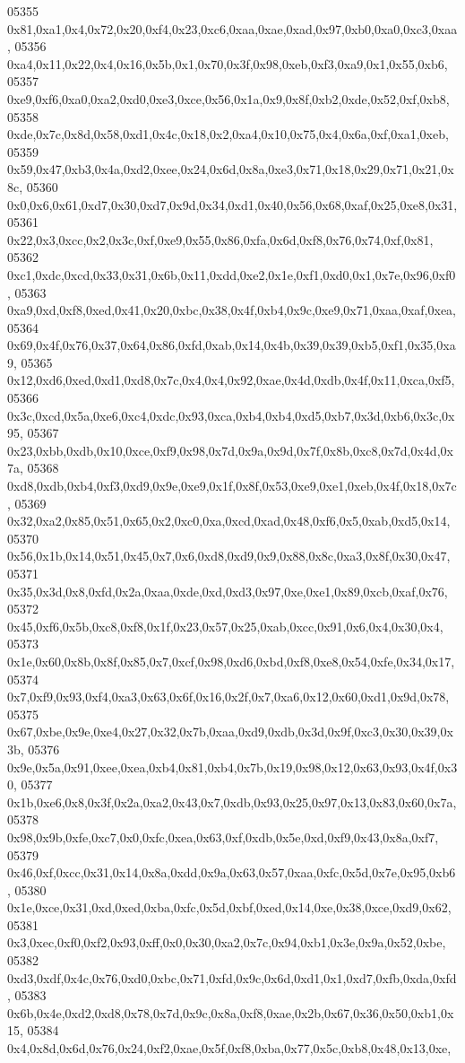 \begin{DoxyCode}
05355   0x81,0xa1,0x4,0x72,0x20,0xf4,0x23,0xc6,0xaa,0xae,0xad,0x97,0xb0,0xa0,0xc3,0xaa,
05356   0xa4,0x11,0x22,0x4,0x16,0x5b,0x1,0x70,0x3f,0x98,0xeb,0xf3,0xa9,0x1,0x55,0xb6,
05357   0xe9,0xf6,0xa0,0xa2,0xd0,0xe3,0xce,0x56,0x1a,0x9,0x8f,0xb2,0xde,0x52,0xf,0xb8,
05358   0xde,0x7c,0x8d,0x58,0xd1,0x4c,0x18,0x2,0xa4,0x10,0x75,0x4,0x6a,0xf,0xa1,0xeb,
05359   0x59,0x47,0xb3,0x4a,0xd2,0xee,0x24,0x6d,0x8a,0xe3,0x71,0x18,0x29,0x71,0x21,0x8c,
05360   0x0,0x6,0x61,0xd7,0x30,0xd7,0x9d,0x34,0xd1,0x40,0x56,0x68,0xaf,0x25,0xe8,0x31,
05361   0x22,0x3,0xcc,0x2,0x3c,0xf,0xe9,0x55,0x86,0xfa,0x6d,0xf8,0x76,0x74,0xf,0x81,
05362   0xc1,0xdc,0xcd,0x33,0x31,0x6b,0x11,0xdd,0xe2,0x1e,0xf1,0xd0,0x1,0x7e,0x96,0xf0,
05363   0xa9,0xd,0xf8,0xed,0x41,0x20,0xbc,0x38,0x4f,0xb4,0x9c,0xe9,0x71,0xaa,0xaf,0xea,
05364   0x69,0x4f,0x76,0x37,0x64,0x86,0xfd,0xab,0x14,0x4b,0x39,0x39,0xb5,0xf1,0x35,0xa9,
05365   0x12,0xd6,0xed,0xd1,0xd8,0x7c,0x4,0x4,0x92,0xae,0x4d,0xdb,0x4f,0x11,0xca,0xf5,
05366   0x3c,0xcd,0x5a,0xe6,0xc4,0xdc,0x93,0xca,0xb4,0xb4,0xd5,0xb7,0x3d,0xb6,0x3c,0x95,
05367   0x23,0xbb,0xdb,0x10,0xce,0xf9,0x98,0x7d,0x9a,0x9d,0x7f,0x8b,0xc8,0x7d,0x4d,0x7a,
05368   0xd8,0xdb,0xb4,0xf3,0xd9,0x9e,0xe9,0x1f,0x8f,0x53,0xe9,0xe1,0xeb,0x4f,0x18,0x7c,
05369   0x32,0xa2,0x85,0x51,0x65,0x2,0xc0,0xa,0xcd,0xad,0x48,0xf6,0x5,0xab,0xd5,0x14,
05370   0x56,0x1b,0x14,0x51,0x45,0x7,0x6,0xd8,0xd9,0x9,0x88,0x8c,0xa3,0x8f,0x30,0x47,
05371   0x35,0x3d,0x8,0xfd,0x2a,0xaa,0xde,0xd,0xd3,0x97,0xe,0xe1,0x89,0xcb,0xaf,0x76,
05372   0x45,0xf6,0x5b,0xc8,0xf8,0x1f,0x23,0x57,0x25,0xab,0xcc,0x91,0x6,0x4,0x30,0x4,
05373   0x1e,0x60,0x8b,0x8f,0x85,0x7,0xcf,0x98,0xd6,0xbd,0xf8,0xe8,0x54,0xfe,0x34,0x17,
05374   0x7,0xf9,0x93,0xf4,0xa3,0x63,0x6f,0x16,0x2f,0x7,0xa6,0x12,0x60,0xd1,0x9d,0x78,
05375   0x67,0xbe,0x9e,0xe4,0x27,0x32,0x7b,0xaa,0xd9,0xdb,0x3d,0x9f,0xc3,0x30,0x39,0x3b,
05376   0x9e,0x5a,0x91,0xee,0xea,0xb4,0x81,0xb4,0x7b,0x19,0x98,0x12,0x63,0x93,0x4f,0x30,
05377   0x1b,0xe6,0x8,0x3f,0x2a,0xa2,0x43,0x7,0xdb,0x93,0x25,0x97,0x13,0x83,0x60,0x7a,
05378   0x98,0x9b,0xfe,0xc7,0x0,0xfc,0xea,0x63,0xf,0xdb,0x5e,0xd,0xf9,0x43,0x8a,0xf7,
05379   0x46,0xf,0xcc,0x31,0x14,0x8a,0xdd,0x9a,0x63,0x57,0xaa,0xfc,0x5d,0x7e,0x95,0xb6,
05380   0x1e,0xce,0x31,0xd,0xed,0xba,0xfc,0x5d,0xbf,0xed,0x14,0xe,0x38,0xce,0xd9,0x62,
05381   0x3,0xec,0xf0,0xf2,0x93,0xff,0x0,0x30,0xa2,0x7c,0x94,0xb1,0x3e,0x9a,0x52,0xbe,
05382   0xd3,0xdf,0x4c,0x76,0xd0,0xbc,0x71,0xfd,0x9c,0x6d,0xd1,0x1,0xd7,0xfb,0xda,0xfd,
05383   0x6b,0x4e,0xd2,0xd8,0x78,0x7d,0x9c,0x8a,0xf8,0xae,0x2b,0x67,0x36,0x50,0xb1,0x15,
05384   0x4,0x8d,0x6d,0x76,0x24,0xf2,0xae,0x5f,0xf8,0xba,0x77,0x5c,0xb8,0x48,0x13,0xe,

\end{DoxyCode}
